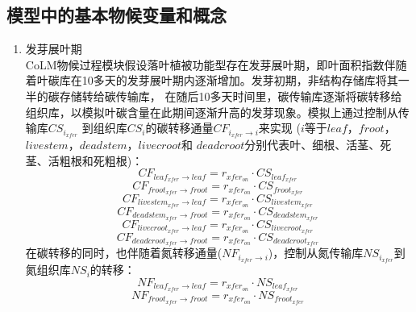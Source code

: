 \subsection{模型中的基本物候变量和概念}\label{模型中的基本物候变量和概念}

\begin{enumerate}
\renewcommand{\theenumi}{\alph{enumi}}
\item 发芽展叶期\\
CoLM物候过程模块假设落叶植被功能型存在发芽展叶期，即叶面积指数伴随着叶碳库在10多天的发芽展叶期内逐渐增加。发芽初期，非结构存储库将其一半的碳存储转给碳传输库，
在随后10多天时间里，碳传输库逐渐将碳转移给组织库，以模拟叶碳含量在此期间逐渐升高的发芽现象。模拟上通过控制从传输库$CS_{i_{xfer}}$
到组织库$CS_i$的碳转移通量$CF_{i_{xfer}\rightarrow i}$来实现
($i$等于$leaf$，$froot$，$livestem$，$deadstem$，$livecroot$和
$deadcroot$分别代表叶、细根、活茎、死茎、活粗根和死粗根)：
\begin{equation}
  CF_{leaf_{xfer}\rightarrow leaf}=r_{{xfer}_{on}}\cdot CS_{leaf_{xfer}}\ 
\end{equation}
\begin{equation}
  CF_{froot_{xfer}\rightarrow froot}=r_{{xfer}_{on}}\cdot CS_{froot_{xfer}}\ 
\end{equation}
\begin{equation}
  CF_{livestem_{xfer}\rightarrow leaf}=r_{{xfer}_{on}}\cdot CS_{livestem_{xfer}}\ 
\end{equation}
\begin{equation}
  CF_{deadstem_{xfer}\rightarrow froot}=r_{{xfer}_{on}}\cdot CS_{deadstem_{xfer}}\ 
\end{equation}
\begin{equation}
  CF_{livecroot_{xfer}\rightarrow leaf}=r_{{xfer}_{on}}\cdot CS_{livecroot_{xfer}}\ 
\end{equation}
\begin{equation}
  CF_{deadcroot_{xfer}\rightarrow froot}=r_{{xfer}_{on}}\cdot CS_{deadcroot_{xfer}}\ 
\end{equation}
在碳转移的同时，也伴随着氮转移通量($NF_{i_{xfer}\rightarrow i}$)，控制从氮传输库$NS_{i_{xfer}}$到氮组织库$NS_{i}$的转移：
\begin{equation}
  NF_{leaf_{xfer}\rightarrow leaf}=r_{{xfer}_{on}}\cdot NS_{leaf_{xfer}}\ 
\end{equation}
\begin{equation}
  NF_{froot_{xfer}\rightarrow froot}=r_{{xfer}_{on}}\cdot NS_{froot_{xfer}}\ 
\end{equation}

\end{enumerate}
